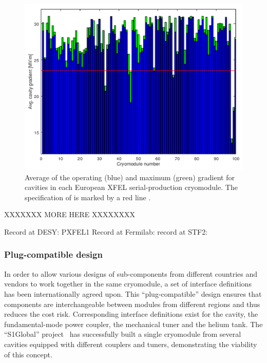 \begin{figure}[htbp]
   \includegraphics[width=\hsize]{chapters/figures/srf17-mopb106-fig1}
\caption{Average of the operating (blue) and maximum
(green) gradient for cavities in each European XFEL serial-production cryomodule.
The specification of  is marked by a red line
\cite{Kasprzak:2018kkr}.
}
\label{fig:cryomodules-performance}
\end{figure}

XXXXXXX MORE HERE XXXXXXXX


Record at DESY: \cite{Kostin:2009a} PXFEL1
Record at Fermilab: \cite{Broemmelsiek:2018iqr}
record at STF2: \cite{Yamamoto:2018kml}

\subsubsection{Plug-compatible design}

In order to allow various designs of sub-components from different countries and vendors to work together in the same cryomodule, a set of interface definitions has been internationally agreed upon.
This ``plug-compatible'' design ensures that components are interchangeable between modules from different regions and thus reduces the cost risk.
Corresponding interface definitions exist for the cavity, the fundamental-mode power coupler, the mechanical tuner and the helium tank.
The ``S1Global'' project~\cite{bib:s1g} has successfully built a single cryomodule from several cavities equipped with different couplers and tuners, demonstrating the viability of this concept.


